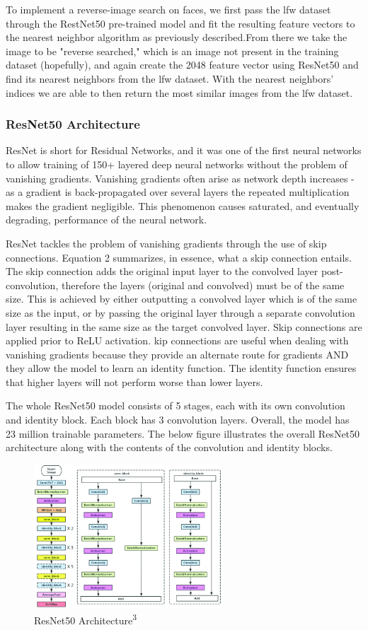\documentclass[conference]{IEEEtran}
\begin{document}
To implement a reverse-image search on faces, we first pass the lfw dataset through the RestNet50 pre-trained model and fit the resulting feature vectors to the nearest neighbor algorithm as previously described.From there we take the image to be "reverse searched," which is an image not present in the training dataset (hopefully), and again create the 2048 feature vector using ResNet50 and find its nearest neighbors from the lfw dataset. With the nearest neighbors' indices we are able to then return the most similar images from the lfw dataset.

\subsubsection{ResNet50 Architecture}

ResNet is short for Residual Networks, and it was one of the first neural networks to allow training of 150+ layered deep neural networks without the problem of vanishing gradients. Vanishing gradients often arise as network depth increases - as a gradient is back-propagated over several layers the repeated multiplication makes the gradient negligible. This phenomenon causes saturated, and eventually degrading, performance of the neural network. 

ResNet tackles the problem of vanishing gradients through the use of skip connections. Equation 2 summarizes, in essence, what a skip connection entails. The skip connection adds the original input layer to the convolved layer post-convolution, therefore the layers (original and convolved) must be of the same size. This is achieved by either outputting a convolved layer which is of the same size as the input, or by passing the original layer through a separate convolution layer resulting in the same size as the target convolved layer. Skip connections are applied prior to ReLU activation. kip connections are useful when dealing with vanishing gradients because they provide an alternate route for gradients AND they allow the model to learn an identity function. The identity function ensures that higher layers will not perform worse than lower layers.

The whole ResNet50 model consists of 5 stages, each with its own convolution and identity block. Each block has 3 convolution layers. Overall, the model has 23 million trainable parameters. The below figure illustrates the overall ResNet50 architecture along with the contents of the convolution and identity blocks.

\begin{figure}[h]
\includegraphics[width=7cm]{resnet50 arch.png}
\centering 
\caption{ResNet50 Architecture\textsuperscript{3}}
\label{fig:1}
\end{figure}
\end{document}
